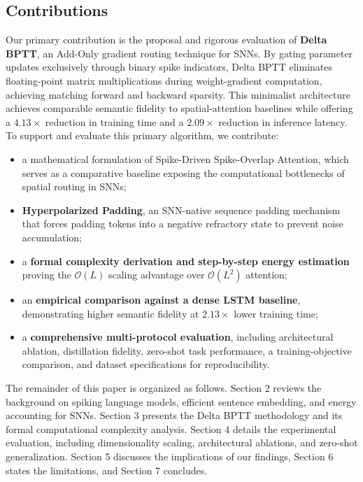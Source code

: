 \documentclass[11pt, conference, compsoc, twoside]{IEEEtran}
\begin{document}
\subsection{Contributions}
Our primary contribution is the proposal and rigorous evaluation of \textbf{Delta BPTT}, an Add-Only gradient routing technique for SNNs. By gating parameter updates exclusively through binary spike indicators, Delta BPTT eliminates floating-point matrix multiplications during weight-gradient computation, achieving matching forward and backward sparsity. This minimalist architecture achieves comparable semantic fidelity to spatial-attention baselines while offering a $4.13\times$ reduction in training time and a $2.09\times$ reduction in inference latency. To support and evaluate this primary algorithm, we contribute:
\begin{itemize}
    \item a mathematical formulation of Spike-Driven Spike-Overlap Attention, which serves as a comparative baseline exposing the computational bottlenecks of spatial routing in SNNs;
    \item \textbf{Hyperpolarized Padding}, an SNN-native sequence padding mechanism that forces padding tokens into a negative refractory state to prevent noise accumulation;
    \item a \textbf{formal complexity derivation and step-by-step energy estimation} proving the $\mathcal{O}(L)$ scaling advantage over $\mathcal{O}(L^2)$ attention;
    \item an \textbf{empirical comparison against a dense LSTM baseline}, demonstrating higher semantic fidelity at $2.13\times$ lower training time;
    \item a \textbf{comprehensive multi-protocol evaluation}, including architectural ablation, distillation fidelity, zero-shot task performance, a training-objective comparison, and dataset specifications for reproducibility.
\end{itemize}

The remainder of this paper is organized as follows. Section 2 reviews the background on spiking language models, efficient sentence embedding, and energy accounting for SNNs. Section 3 presents the Delta BPTT methodology and its formal computational complexity analysis. Section 4 details the experimental evaluation, including dimensionality scaling, architectural ablations, and zero-shot generalization. Section 5 discusses the implications of our findings, Section 6 states the limitations, and Section 7 concludes.
\end{document}
